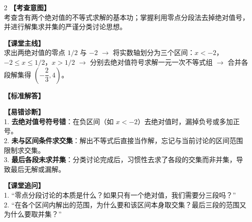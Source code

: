 \documentclass[11pt,a4paper]{ctexart}
\begin{document}
\begin{paracol}{2}
  \textbf{【考查意图】}\\
  考查含有两个绝对值的不等式求解的基本功；掌握利用零点分段法去掉绝对值号，并进行解集求并集的严谨分类讨论思想。
  
  \textbf{【课堂主线】}\\
  求出两绝对值的零点 \(1/2\) 与 \(-2\) \(\to\) 将实数轴划分为三个区间：\(x < -2\)，\(-2 \leqslant x \leqslant 1/2\)，\(x > 1/2\) \(\to\) 分别去绝对值符号求解一元一次不等式组 \(\to\) 合并各段解集得 \(\left(-\dfrac{2}{3}, 4\right)\)。
  
  \textbf{【标准解答】}\\
  \qSevenSolution

  \switchcolumn
  \textbf{【易错诊断】}\\
  1. \textbf{去绝对值号符号错}：在负区间（如 \(x < -2\)）去绝对值时，漏掉负号或多加正号。\\
  2. \textbf{未与区间条件求交集}：解出不等式后直接当作解，忘记与当前讨论的区间范围限制求交集。\\
  3. \textbf{最后各段未求并集}：分类讨论完成后，习惯性去求了各段的交集而非并集，导致最后无解或漏解。
  
  \textbf{【课堂追问】}\\
  1. “零点分段讨论的本质是什么？如果只有一个绝对值，我们需要分三段吗？”\\
  2. “在各个区间内解出的范围，为什么要和该区间本身取交集？最后三段的范围又为什么要取并集？”
\end{paracol}

\vspace{0.8em}
\par{}
\vspace{0.8em}

\qEightStem
\end{document}
